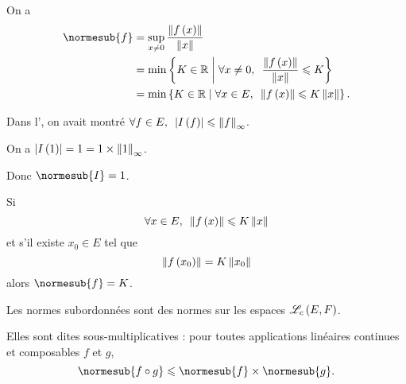 \begin{dem}
On a \[\begin{aligned}
\normesub{f}&=\sup_{x\not=0}\dfrac{\norme{f\paren{x}}}{\norme{x}} \\
&=\min\accol{K\in\R\tq\quantifs{\forall x\not=0}\dfrac{\norme{f\paren{x}}}{\norme{x}}\leq K} \\
&=\min\accol{K\in\R\tq\quantifs{\forall x\in E}\norme{f\paren{x}}\leq K\norme{x}}.
\end{aligned}\]
\end{dem}

\begin{ex}
Dans l', on avait montré \(\quantifs{\forall f\in E}\abs{I\paren{f}}\leq\norme{f}_\infty\).

On a \(\abs{I\paren{1}}=1=1\times\norme{1}_\infty\).

Donc \(\normesub{I}=1\).
\end{ex}

\begin{meth}
Si \[\quantifs{\forall x\in E}\norme{f\paren{x}}\leq K\norme{x}\] et s'il existe \(x_0\in E\) tel que \[\norme{f\paren{x_0}}=K\norme{x_0}\] alors \(\normesub{f}=K\).
\end{meth}

\begin{prop}
Les normes subordonnées sont des normes sur les espaces \(\mathscr{L}_c\left(E,F\right)\).

Elles sont dites sous-multiplicatives : pour toutes applications linéaires continues et composables \(f\) et \(g\), \[\normesub{f\rond g}\leq\normesub{f}\times\normesub{g}.\]
\end{prop}

